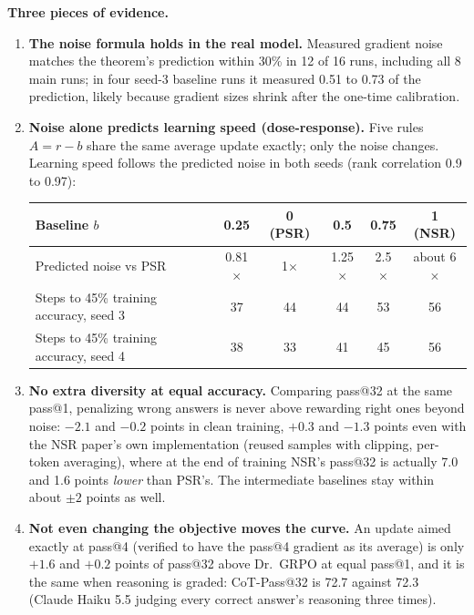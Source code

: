 \documentclass[11pt]{article}
\begin{document}
\textbf{Three pieces of evidence.}
\begin{enumerate}[leftmargin=*,itemsep=2pt]
\item \textbf{The noise formula holds in the real model.} Measured gradient noise matches the theorem's prediction within 30\% in 12 of 16 runs, including all 8 main runs; in four seed-3 baseline runs it measured 0.51 to 0.73 of the prediction, likely because gradient sizes shrink after the one-time calibration.
\item \textbf{Noise alone predicts learning speed (dose-response).} Five rules $A=r-b$ share the same average update exactly; only the noise changes. Learning speed follows the predicted noise in both seeds (rank correlation 0.9 to 0.97):

\begin{center}\small
\begin{tabular}{@{}lccccc@{}}
\toprule
Baseline $b$ & 0.25 & 0 (PSR) & 0.5 & 0.75 & 1 (NSR)\\
\midrule
Predicted noise vs PSR & 0.81$\times$ & 1$\times$ & 1.25$\times$ & 2.5$\times$ & about 6$\times$\\
Steps to 45\% training accuracy, seed 3 & 37 & 44 & 44 & 53 & 56\\
Steps to 45\% training accuracy, seed 4 & 38 & 33 & 41 & 45 & 56\\
\bottomrule
\end{tabular}
\end{center}
\item \textbf{No extra diversity at equal accuracy.} Comparing pass@32 at the same pass@1, penalizing wrong answers is never above rewarding right ones beyond noise: $-2.1$ and $-0.2$ points in clean training, $+0.3$ and $-1.3$ points even with the NSR paper's own implementation (reused samples with clipping, per-token averaging), where at the end of training NSR's pass@32 is actually 7.0 and 1.6 points \emph{lower} than PSR's. The intermediate baselines stay within about $\pm2$ points as well.
\item \textbf{Not even changing the objective moves the curve.} An update aimed exactly at pass@4 (verified to have the pass@4 gradient as its average) is only $+1.6$ and $+0.2$ points of pass@32 above Dr.\ GRPO at equal pass@1, and it is the same when reasoning is graded: CoT-Pass@32 is 72.7 against 72.3 (Claude Haiku 5.5 judging every correct answer's reasoning three times).
\end{enumerate}
\end{document}
